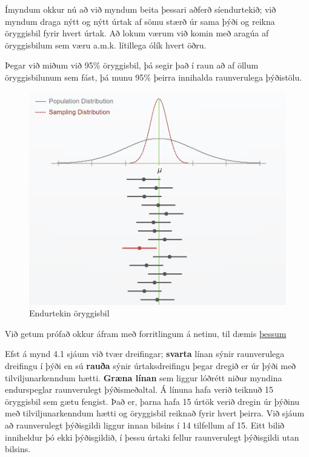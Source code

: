 \documentclass[
]{book}
\begin{document}
Ímyndum okkur nú að við myndum beita þessari aðferð síendurtekið; við myndum draga nýtt og nýtt úrtak af sömu stærð úr sama þýði og reikna öryggisbil fyrir hvert úrtak. Að lokum værum við komin með aragúa af öryggisbilum sem væru a.m.k. lítillega ólík hvert öðru.

Þegar við miðum við 95\% öryggisbil, þá segir það í raun að af öllum öryggisbilunum sem fást, þá munu 95\% þeirra innihalda raunverulega þýðistölu.

\begin{figure}
\includegraphics[width=12.43in]{images/endurtekin_oryggisbil} \caption{Endurtekin öryggisbil}\label{fig:unnamed-chunk-2}
\end{figure}

Við getum prófað okkur áfram með forritlingum á netinu, til dæmis \href{http://digitalfirst.bfwpub.com/stats_applet/stats_applet_4_ci.html}{þessum}

Efst á mynd 4.1 sjáum við tvær dreifingar; \textbf{svarta} línan sýnir raunverulega dreifingu í þýði en sú \textbf{rauða} sýnir úrtaksdreifingu þegar dregið er úr þýði með tilviljunarkenndum hætti. \textbf{Græna línan} sem liggur lóðrétt niður myndina endurspeglar raunverulegt þýðismeðaltal. Á línuna hafa verið teiknuð 15 öryggisbil sem gætu fengist. Það er, þarna hafa 15 úrtök verið dregin úr þýðinu með tilviljunarkenndum hætti og öryggisbil reiknað fyrir hvert þeirra. Við sjáum að raunverulegt þýðisgildi liggur innan bilsins í 14 tilfellum af 15. Eitt bilið inniheldur þó ekki þýðisgildið, í þessu úrtaki fellur raunverulegt þýðisgildi utan bilsins.
\end{document}

